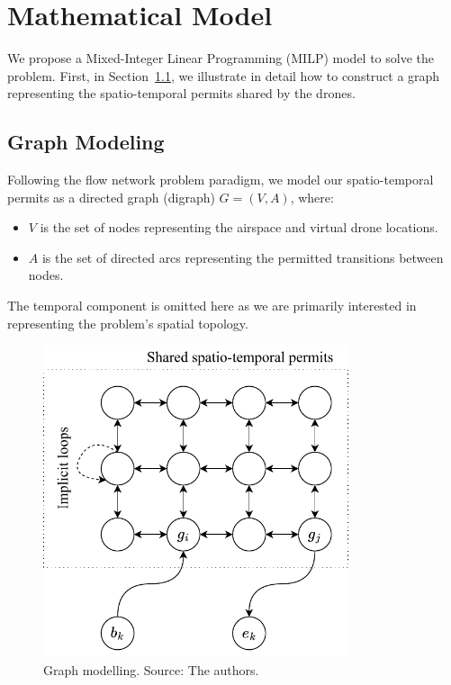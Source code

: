 \section[Mathematical Model]{Mathematical Model}
\label{Mathematical_Model}

We propose a Mixed-Integer Linear Programming (MILP) model to solve the problem. First, in Section~\ref{graph-modeling}, we illustrate in detail how to construct a graph representing the spatio-temporal permits shared by the drones.

\subsection{Graph Modeling} \label{graph-modeling}

Following the flow network problem paradigm, we model our spatio-temporal permits as a directed graph (digraph) $G = (V, A)$, where:

\begin{itemize}
  \item $V$ is the set of nodes representing the airspace and virtual drone locations.
  \item $A$ is the set of directed arcs representing the permitted transitions between nodes.
\end{itemize}

The temporal component is omitted here as we are primarily interested in representing the problem's spatial topology.

\begin{figure}[H]
  \centering
  \includegraphics[width=0.8\textwidth]{img/graph_model.pdf}
  \caption[graph modelling]{Graph modelling. Source: The authors.}
  \label{fig:graph_model}
\end{figure}



